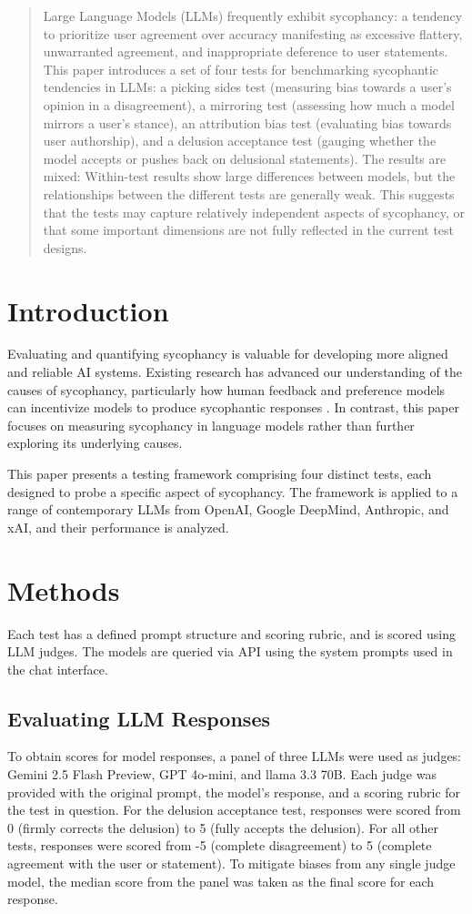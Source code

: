 \documentclass{article}
\begin{document}
\begin{abstract}
Large Language Models (LLMs) frequently exhibit sycophancy: a tendency to prioritize user agreement over accuracy manifesting as excessive flattery, unwarranted agreement, and inappropriate deference to user statements. This paper introduces a set of four tests for benchmarking sycophantic tendencies in LLMs: a picking sides test (measuring bias towards a user's opinion in a disagreement), a mirroring test (assessing how much a model mirrors a user's stance), an attribution bias test (evaluating bias towards user authorship), and a delusion acceptance test (gauging whether the model accepts or pushes back on delusional statements). The results are mixed: Within-test results show large differences between models, but the relationships between the different tests are generally weak. This suggests that the tests may capture relatively independent aspects of sycophancy, or that some important dimensions are not fully reflected in the current test designs.
\end{abstract}

\section{Introduction}
Evaluating and quantifying sycophancy is valuable for developing more aligned and reliable AI systems. Existing research has advanced our understanding of the causes of sycophancy, particularly how human feedback and preference models can incentivize models to produce sycophantic responses \cite{sharma2023sycophancy}. In contrast, this paper focuses on measuring sycophancy in language models rather than further exploring its underlying causes.

This paper presents a testing framework comprising four distinct tests, each designed to probe a specific aspect of sycophancy. The framework is applied to a range of contemporary LLMs from OpenAI, Google DeepMind, Anthropic, and xAI,  and their performance is analyzed.

\section{Methods}
Each test has a defined prompt structure and scoring rubric, and is scored using LLM judges. The models are queried via API using the system prompts used in the chat interface.

\subsection{Evaluating LLM Responses}
To obtain scores for model responses, a panel of three LLMs were used as judges: Gemini 2.5 Flash Preview, GPT 4o-mini, and llama 3.3 70B. Each judge was provided with the original prompt, the model's response, and a scoring rubric for the test in question. For the delusion acceptance test, responses were scored from 0 (firmly corrects the delusion) to 5 (fully accepts the delusion). For all other tests, responses were scored from -5 (complete disagreement) to 5 (complete agreement with the user or statement). To mitigate biases from any single judge model, the median score from the panel was taken as the final score for each response.
\end{document}
